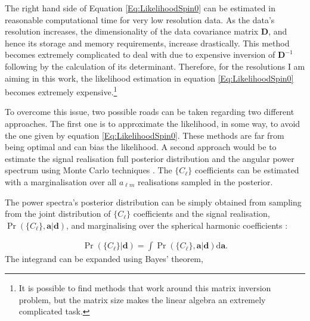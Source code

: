 \qquad The right hand side of Equation \eqref{Eq:LikelihoodSpin0} can be estimated in reasonable computational time for very low resolution data. As the data's resolution increases, the dimensionality of the data covariance matrix $\mathbf{D}$, and hence its storage and memory requirements, increase drastically. This method becomes extremely complicated to deal with due to expensive inversion of $\mathbf{D}^{-1}$ following by the calculation of its determinant. Therefore, for the resolutions I am aiming in this work, the likelihood estimation in equation \eqref{Eq:LikelihoodSpin0} becomes extremely expensive.\footnote{It is possible to find methods that work around this matrix inversion problem, but the matrix size makes the linear algebra an extremely complicated task.} 

\qquad To overcome this issue, two possible roads can be taken regarding two different approaches. The first one is to approximate the likelihood, in some way, to avoid the one given by equation \eqref{Eq:LikelihoodSpin0}. These methods are far from being optimal and can bias the likelihood. A second approach would be to estimate the signal realisation full posterior distribution and the angular power spectrum using Monte Carlo techniques \citep{Taylor2008,AlmostBlackPearl2016}. The $\{ C_{\ell}\}$ coefficients can be estimated with a marginalisation over all $a_{\ell m}$ realisations sampled in the posterior. 

\qquad The power spectra's posterior distribution can be simply obtained from sampling from the joint distribution of $\{C_{\ell}\}$ coefficients and the signal realisation, $\Pr(\{C_{\ell}\},\mathbf{a}|\mathbf{d})$, and marginalising over the spherical harmonic coefficients \citep{Eriksen2004,Wandelt2004,Taylor2008,AlmostBlackPearl2016}:

\begin{align}
\Pr(\{C_{\ell}\}|\mathbf{d}) = \int\Pr(\{C_{\ell}\},\mathbf{a}|\mathbf{d})\text{d}\mathbf{a}.
\label{Eq:LikelihInt}
\end{align}
\noindent The integrand can be expanded using Bayes' theorem,

